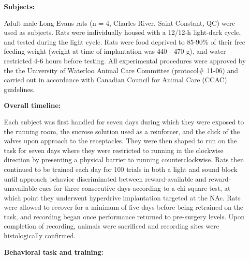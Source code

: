 \documentclass[11pt]{article}
\begin{document}
{\bf Subjects:}

Adult male Long-Evans rats (n = 4, Charles River, Saint Constant, QC) were used as subjects. Rats were individually housed with a 12/12-h light-dark cycle, and tested during the light cycle. Rats were food deprived to 85-90\% of their free feeding weight (weight at time of implantation was 440 - 470 g), and water restricted 4-6 hours before testing. All experimental procedures were approved by the the University of Waterloo Animal Care Committee (protocol\# 11-06) and carried out in accordance with Canadian Council for Animal Care (CCAC) guidelines.

{\bf Overall timeline:}

Each subject was first handled for seven days during which they were exposed to the running room, the sucrose solution used as a reinforcer, and the click of the valves upon approach to the receptacles. They were then shaped to run on the task for seven days where they were restricted to running in the clockwise direction by presenting a physical barrier to running counterclockwise. Rats then continued to be trained each day for 100 trials in both a light and sound block until approach behavior discriminated between reward-available and reward-unavailable cues for three consecutive days according to a chi square test, at which point they underwent hyperdrive implantation targeted at the NAc. Rats were allowed to recover for a minimum of five days before being retrained on the task, and recording began once performance returned to pre-surgery levels. Upon completion of recording, animals were sacrificed and recording sites were histologically confirmed.

{\bf Behavioral task and training:}
\end{document}

